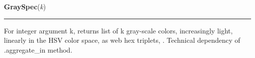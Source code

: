 \hspace{.8\funcindent}\begin{boxedminipage}{\funcwidth}

    \raggedright \textbf{GraySpec}(\textit{k})

    \vspace{-1.5ex}

    \rule{\textwidth}{0.5\fboxrule}
\setlength{\parskip}{2ex}
    For integer argument k, returns list of k gray-scale colors, 
    increasingly light, linearly in the HSV color space, as web hex 
    triplets, . Technical dependency of .aggregate\_in method.

\setlength{\parskip}{1ex}
    \end{boxedminipage}

    \label{Classes:DotData:DotDataAggregate}

    \vspace{0.5ex}

